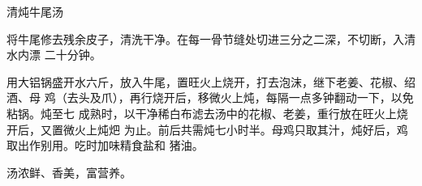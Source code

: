 \begin{recipe}{清炖牛尾汤}

\ingredients


\preparation

将牛尾修去残余皮子，清洗干净。在每一骨节缝处切进三分之二深，不切断，入清水内漂
二十分钟。

用大铝锅盛开水六斤，放入牛尾，置旺火上烧开，打去泡沫，继下老姜、花椒、绍酒、母
鸡（去头及爪），再行烧开后，移微火上炖，每隔一点多钟翻动一下，以免粘锅。炖至七
成熟时，以干净稀白布滤去汤中的花椒、老姜，重行放在旺火上烧开后，又置微火上炖𤆵
为止。前后共需炖七小时半。母鸡只取其汁，炖好后，鸡取出作别用。吃时加味精食盐和
猪油。

\features

汤浓鲜、香美，富营养。

\end{recipe}

